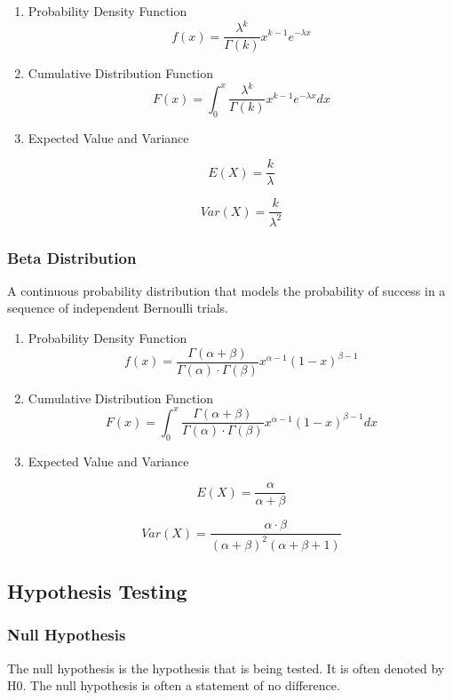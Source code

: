 \documentclass[11pt]{article}
\def\cheatsheetitemsep{-0.5em}
\let\olditem\item
\def\item{\vspace{\cheatsheetitemsep}\olditem}
\begin{document}
\begin{enumerate}
\item Probability Density Function
\label{sec:org58f5a87}
\[
f(x) = \frac{\lambda^k}{\Gamma(k)} x^{k-1} e^{-\lambda x}
\]

\item Cumulative Distribution Function
\label{sec:org7b0ce59}
\[
F(x) = \int_0^x \frac{\lambda^k}{\Gamma(k)} x^{k-1} e^{-\lambda x} dx
\]

\item Expected Value and Variance
\label{sec:org672c699}

\[
E(X) = \frac{k}{\lambda}
\]

\[
Var(X) = \frac{k}{\lambda^2}
\]
\end{enumerate}

\subsubsection{Beta Distribution}
\label{sec:org2237ddd}
A continuous probability distribution that models the probability of success in a sequence of independent Bernoulli trials.

\begin{enumerate}
\item Probability Density Function
\label{sec:orge525be8}
\[
f(x) = \frac{\Gamma(\alpha + \beta)}{\Gamma(\alpha) \cdot \Gamma(\beta)} x^{\alpha-1} (1-x)^{\beta-1}
\]

\item Cumulative Distribution Function
\label{sec:org5209ee1}
\[
F(x) = \int_0^x \frac{\Gamma(\alpha + \beta)}{\Gamma(\alpha) \cdot \Gamma(\beta)} x^{\alpha-1} (1-x)^{\beta-1} dx
\]

\item Expected Value and Variance
\label{sec:org49ff00f}

\[
E(X) = \frac{\alpha}{\alpha + \beta}
\]

\[
Var(X) = \frac{\alpha \cdot \beta}{(\alpha + \beta)^2 (\alpha + \beta + 1)}
\]
\end{enumerate}


\subsection{Hypothesis Testing}
\label{sec:orgdb0fb8f}
\subsubsection{Null Hypothesis}
\label{sec:org9c190f4}
The null hypothesis is the hypothesis that is being tested. It is often denoted by H0. The null hypothesis is often a statement of no difference.
\end{document}
